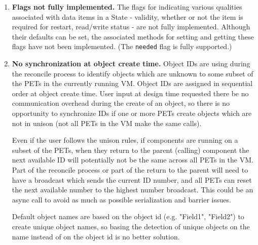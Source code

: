 %


\begin{enumerate}
\item{\bf Flags not fully implemented.}
The flags for indicating various qualities associated with 
data items in a State - validity, whether or not the item is
required for restart, read/write status - are not fully implemented.
Although their defaults can be set, the associated methods for 
setting and getting these flags have not been implemented.
(The {\tt needed} flag is fully supported.)

\item{\bf No synchronization at object create time.}
Object IDs are using during the reconcile process to identify objects
which are unknown to some subset of the PETs in the currently running VM.
Object IDs are assigned in sequential order at object create time.
User input at design time requested there be no communication overhead
during the create of an object, so there is no opportunity to
synchronize IDs if one or more PETs create objects which
are not in unison (not all PETs in the VM make the same calls).

Even if the user follows the unison rules, if components are running on 
a subset of the PETs, when they return to the parent (calling) component
the next available ID will potentially not be the same across all
PETs in the VM.  Part of the reconcile process or part of the return
to the parent will need to have a broadcast which sends the current
ID number, and all PETs can reset the next available number to the highest
number broadcast.  This could be an async call to avoid as much as
possible serialization and barrier issues.

Default object names are based on the object id (e.g. "Field1", "Field2")
to create unique object names, so basing the detection of unique objects 
on the name instead of on the object id is no better solution.

\end{enumerate}



